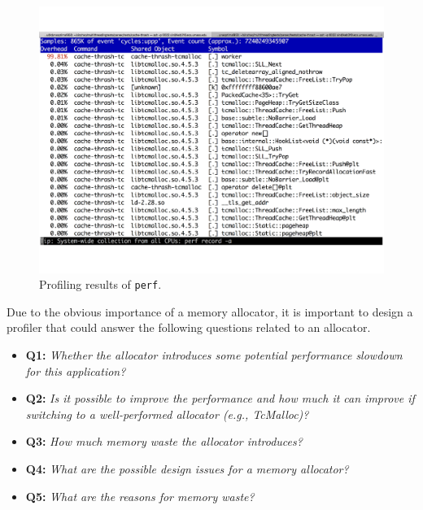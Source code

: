 \begin{figure}[htbp]
\centering
\includegraphics[width=0.95\columnwidth]{figures/perf-cache-thrash-tcmalloc}
\caption{Profiling results of \texttt{perf}. \label{fig:mot1}}
\end{figure}


Due to the obvious importance of a memory allocator, it is important to design a profiler that could answer the following questions related to an allocator. 

\begin{itemize}
\item \textbf{Q1:} \textit{Whether the allocator introduces some potential performance slowdown for this application? }
\item \textbf{Q2:} \textit{Is it possible to improve the performance and how much it can improve if switching to a well-performed allocator (e.g., TcMalloc)?}
\item \textbf{Q3:} \textit{How much memory waste the allocator introduces?}
\item \textbf{Q4:} \textit{What are the possible design issues for a memory allocator?}
\item \textbf{Q5:} \textit{What are the reasons for memory waste?}
\end{itemize}
\vspace{0.1in}


